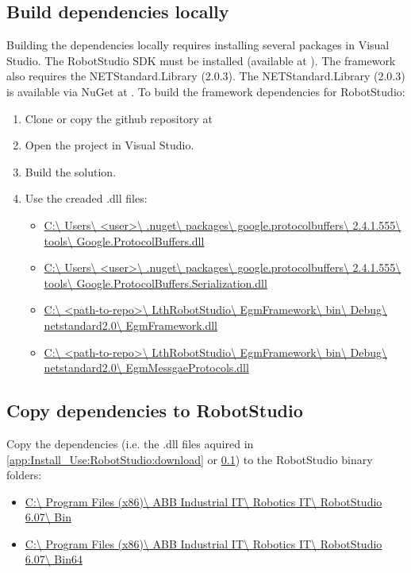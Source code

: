 \documentclass{cslthse-msc}
\begin{document}
\begin{appendices}
\subsection{Build dependencies locally}
\label{app:Install_Use:RobotStudio:build}
Building the dependencies locally requires installing several packages in Visual Studio. The RobotStudio SDK must be installed (available at \cite{ABB:RS_SDK}). The framework also requires the NETStandard.Library (2.0.3). The NETStandard.Library (2.0.3) is available via NuGet at \cite{Microsoft:DNet}. To build the framework dependencies for RobotStudio:
\begin{enumerate}
    \item Clone or copy the github repository at \cite{Greg:LthRobotStudio}
    \item Open the project in Visual Studio.
    \item Build the solution.
    \item Use the creaded .dll files:
        \begin{itemize}
            \item \url{C:\ Users\ <user>\ .nuget\ packages\ google.protocolbuffers\ 2.4.1.555\ tools\ Google.ProtocolBuffers.dll}
            \item \url{C:\ Users\ <user>\ .nuget\ packages\ google.protocolbuffers\ 2.4.1.555\ tools\ Google.ProtocolBuffers.Serialization.dll}
            \item \url{C:\ <path-to-repo>\ LthRobotStudio\ EgmFramework\ bin\ Debug\ netstandard2.0\ EgmFramework.dll}
            \item \url{C:\ <path-to-repo>\ LthRobotStudio\ EgmFramework\ bin\ Debug\ netstandard2.0\ EgmMessgaeProtocols.dll}
        \end{itemize}
\end{enumerate}

\subsection{Copy dependencies to RobotStudio}
\label{app:Install_Use:RobotStudio:copy_to_RS}
Copy the dependencies (i.e. the .dll files aquired in \ref{app:Install_Use:RobotStudio:download} or \ref{app:Install_Use:RobotStudio:build}) to the RobotStudio binary folders:
\begin{itemize}
    \item \url{C:\ Program Files (x86)\ ABB Industrial IT\ Robotics IT\ RobotStudio 6.07\ Bin}
    \item \url{C:\ Program Files (x86)\ ABB Industrial IT\ Robotics IT\ RobotStudio 6.07\ Bin64}
\end{itemize}


\end{appendices}
\end{document}
